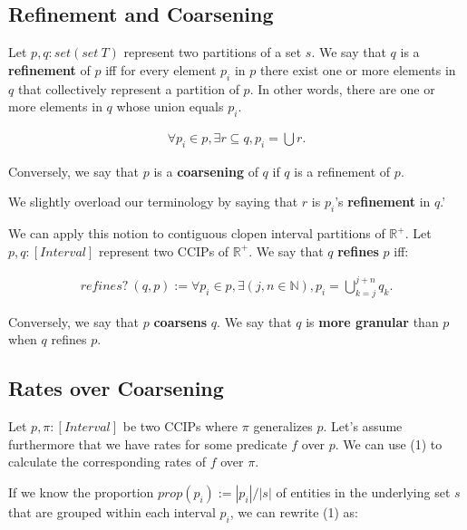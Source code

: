 \documentclass[]{article}
\begin{document}
\hypertarget{refinement-and-coarsening}{%
\subsection{Refinement and Coarsening}\label{refinement-and-coarsening}}

Let \(p, q : set (set\ T)\) represent two partitions of a set \(s\). We
say that \(q\) is a \textbf{refinement} of \(p\) iff for every element
\(p_i\) in \(p\) there exist one or more elements in \(q\) that
collectively represent a partition of \(p\). In other words, there are
one or more elements in \(q\) whose union equals \(p_i\).

\begin{align*}
\forall p_i \in p, \exists r \subseteq q, p_i = \bigcup r. 
\end{align*}

Conversely, we say that \(p\) is a \textbf{coarsening} of \(q\) if \(q\)
is a refinement of \(p\).

We slightly overload our terminology by saying that \(r\) is \(p_i\)'s
\textbf{refinement} in \(q\).'

We can apply this notion to contiguous clopen interval partitions of
\(\mathbb{R}^+\). Let \(p, q : [Interval]\) represent two CCIPs of
\(\mathbb{R}^+\). We say that \(q\) \textbf{refines} \(p\) iff:

\begin{align*}
refines?\ (q, p) := \forall p_i \in p, \exists (j, n \in \mathbb{N}), p_i = \bigcup_{k=j}^{j+n} q_k.
\end{align*}

Conversely, we say that \(p\) \textbf{coarsens} \(q\). We say that \(q\)
is \textbf{more granular} than \(p\) when \(q\) refines \(p\).

\hypertarget{rates-over-coarsening}{%
\subsection{Rates over Coarsening}\label{rates-over-coarsening}}

Let \(p, \pi : [Interval]\) be two CCIPs where \(\pi\) generalizes
\(p\). Let's assume furthermore that we have rates for some predicate
\(f\) over \(p\). We can use (1) to calculate the corresponding rates of
\(f\) over \(\pi\).

If we know the proportion \(prop (p_i) := |p_i|/|s|\) of entities in the
underlying set \(s\) that are grouped within each interval \(p_i\), we
can rewrite (1) as:
\end{document}

